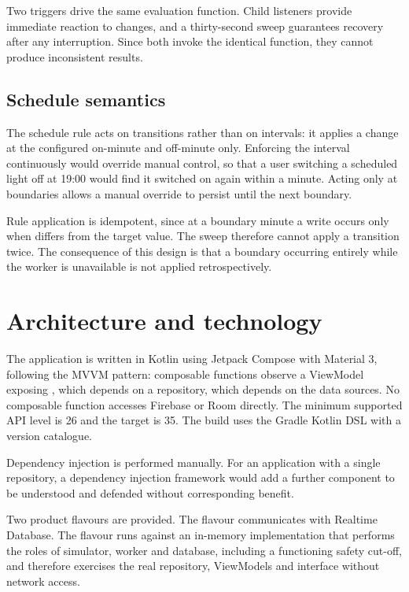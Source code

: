 \documentclass[11pt,a4paper]{article}
\begin{document}
Two triggers drive the same evaluation function. Child listeners provide
immediate reaction to changes, and a thirty-second sweep guarantees recovery
after any interruption. Since both invoke the identical function, they cannot
produce inconsistent results.

\subsection{Schedule semantics}

The schedule rule acts on transitions rather than on intervals: it applies a
change at the configured on-minute and off-minute only. Enforcing the interval
continuously would override manual control, so that a user switching a scheduled
light off at 19:00 would find it switched on again within a minute. Acting only
at boundaries allows a manual override to persist until the next boundary.

Rule application is idempotent, since at a boundary minute a write occurs only
when  differs from the target value. The sweep therefore
cannot apply a transition twice. The consequence of this design is that a
boundary occurring entirely while the worker is unavailable is not applied
retrospectively.

\appendix
\newpage
\section{Architecture and technology}
\label{app:architecture}

The application is written in Kotlin using Jetpack Compose with Material 3,
following the MVVM pattern: composable functions observe a ViewModel exposing
, which depends on a repository, which depends on the data
sources. No composable function accesses Firebase or Room directly. The minimum
supported API level is 26 and the target is 35. The build uses the Gradle Kotlin
DSL with a version catalogue.

Dependency injection is performed manually. For an application with a single
repository, a dependency injection framework would add a further component to be
understood and defended without corresponding benefit.

Two product flavours are provided. The  flavour communicates with
Realtime Database. The  flavour runs against an in-memory
implementation that performs the roles of simulator, worker and database,
including a functioning safety cut-off, and therefore exercises the real
repository, ViewModels and interface without network access.
\end{document}
